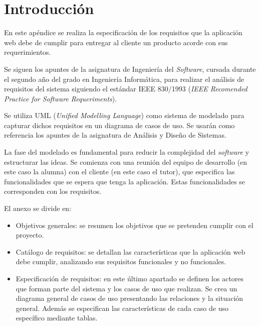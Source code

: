 
\section{Introducción}
En este apéndice se realiza la especificación de los requisitos que la aplicación web debe de cumplir para entregar al cliente un producto acorde con sus requerimientos.

Se siguen los apuntes de la asignatura de Ingeniería del \textit{Software}, cursada durante el segundo año del grado en Ingeniería Informática, para realizar el análisis de requisitos del sistema siguiendo el estándar IEEE 830/1993 (\textit{IEEE Recomended Practice for Software Requeriments}).

Se utiliza UML (\textit{Unified Modelling Language}) como sistema de modelado para capturar dichos requisitos en un diagrama de casos de uso. Se usarán como referencia los apuntes de la asignatura de Análisis y Diseño de Sistemas.

La fase del modelado es fundamental para reducir la complejidad del \textit{software} y estructurar las ideas. Se comienza con una reunión del equipo de desarrollo (en este caso la alumna) con el cliente (en este caso el tutor), que especifica las funcionalidades que se espera que tenga la aplicación. Estas funcionalidades se corresponden con los requisitos.

El anexo se divide en:
\begin{itemize}
    \item Objetivos generales: se resumen los objetivos que se pretenden cumplir con el proyecto.
    \item Catálogo de requisitos: se detallan las características que la aplicación web debe cumplir, analizando sus requisitos funcionales y no funcionales.
    \item Especificación de requisitos: en este último apartado se definen los actores que forman parte del sistema y los casos de uso que realizan. Se crea un diagrama general de casos de uso presentando las relaciones y la situación general. Además se especifican las características de cada caso de uso específico mediante tablas.
\end{itemize}


